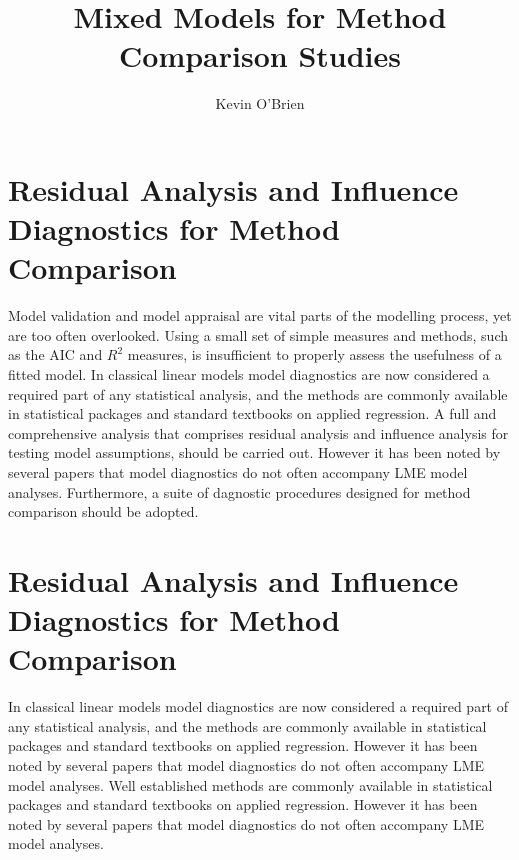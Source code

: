 \documentclass[]{report}
\begin{document}
	\author{Kevin O'Brien}
	\title{Mixed Models for Method Comparison Studies}
	\tableofcontents
	

	
	\chapter{Residual Analysis and Influence Diagnostics for Method Comparison}
	Model validation and model appraisal are vital parts of the modelling process, yet are too often overlooked. Using a small set of simple measures and methods, such as the AIC and $R^2$ measures, is insufficient to properly assess the usefulness of a fitted model. In classical linear models model diagnostics are now considered a required part of any statistical analysis, and the methods are commonly available in statistical packages and standard textbooks on applied regression. A full and comprehensive
	analysis that comprises residual analysis and influence analysis for testing model assumptions, should be carried out. However it has been noted by several papers \citep{Christensen, schabenberger} that model diagnostics do not often accompany LME model analyses. Furthermore, a suite of dagnostic procedures designed for method comparison should be adopted.
	
	

	\chapter{Residual Analysis and Influence Diagnostics for Method Comparison}
	

 In classical linear models model diagnostics are now considered a required part of any statistical analysis, and the methods are commonly available in statistical packages and standard textbooks on applied regression. However it has been noted by several papers \citep{Christensen, schabenberger} that model diagnostics do not often accompany LME model analyses. Well established methods are commonly available in statistical packages and standard textbooks on applied regression. However it has been noted by several papers that model diagnostics do not often accompany LME model analyses. 
\end{document}
